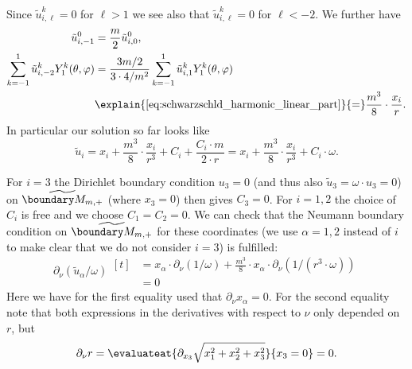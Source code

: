\documentclass[titlepage,numbers=noenddot,oneside,%
cleardoublepage=empty,paper=a4,fontsize=11pt,%
english,%
]{scrartcl}
\begin{document}
\begin{description}
\begin{align*}
    \end{align*}
    Since \( \tilde{u}^k_{i,\ell}=0 \) for \( \ell>1 \) we see also that \( \tilde{u}^k_{i,\ell}=0 \) for \( \ell< -2 \). We further have
    \begin{align*}
        \tilde{u}^0_{i,-1}&=\frac{m}{2}\tilde{u}_{i,0}^0,\\
        \sum_{k=-1}^{1}\tilde{u}^k_{i,-2}Y^k_1(\theta,\varphi)&\begin{aligned}[t]
            &=\frac{3m/2}{3\cdot 4/m^2}\sum_{k=-1}^{1}\tilde{u}^k_{i,1}Y^k_1(\theta,\varphi)\\
            &\explain{\cref{eq:schwarzschld_harmonic_linear_part}}{=}\frac{m^3}{8}\cdot \frac{x_i}{r}.
        \end{aligned}
    \end{align*}
    In particular our solution so far looks like
    \begin{equation*}
        \tilde{u}_i=x_i+\frac{m^3}{8}\cdot \frac{x_i}{r^3}+C_i+\frac{C_i\cdot m}{2\cdot r}=x_i+\frac{m^3}{8}\cdot \frac{x_i}{r^3}+C_i\cdot \omega.
    \end{equation*}
    
    For \( i=3 \) the Dirichlet boundary condition \( u_3=0 \) (and thus also \( \tilde{u}_3=\omega\cdot u_3=0 \)) on \( \schwarzschildboundary \) (where \( x_3=0 \)) then gives \( C_3=0 \). For \( i=1,2 \) the choice of \( C_i \) is free and we choose \( C_1=C_2=0 \). We can check that the Neumann boundary condition on \( \schwarzschildboundary \) for these coordinates (we use \( \alpha=1,2 \) instead of \( i \) to make clear that we do not consider \( i=3 \)) is fulfilled:
    \begin{equation*}
        \partial_\nu (\tilde{u}_{\alpha}/\omega)\begin{aligned}[t]
            &=x_\alpha\cdot \partial_\nu (1/\omega)+\frac{m^3}{8}\cdot x_\alpha \cdot \partial_\nu(1/(r^3\cdot \omega))\\
            &=0
        \end{aligned}
    \end{equation*}
    Here we have for the first equality used that \( \partial_\nu x_\alpha=0 \). For the second equality note that both expressions in the derivatives with respect to \( \nu \) only depended on \( r \), but 
    \begin{equation*}
        \partial_\nu r=\evaluateat{\partial_{x_3} \sqrt{x_1^2+x_2^2+x_3^2}}{x_3=0}=0.
    \end{equation*}


\end{description}
\end{document}
